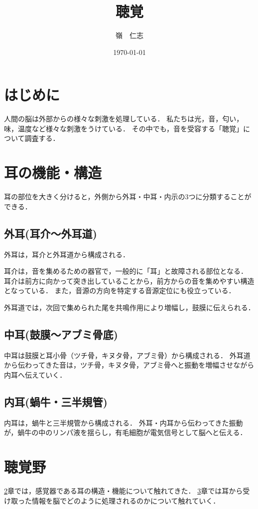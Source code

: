 \documentclass[12pt]{jarticle}
\title{聴覚}
\author{嶺　仁志}
\date{\today}
\begin{document}
\maketitle
\section{はじめに}
\label{intro}
人間の脳は外部からの様々な刺激を処理している．
私たちは光，音，匂い，味，温度など様々な刺激をうけている．
その中でも，音を受容する「聴覚」について調査する．\cite{構造}
\section{耳の機能・構造}
\label{ear}
耳の部位を大きく分けると，外側から外耳・中耳・内示の3つに分類することができる．
\subsection{外耳(耳介～外耳道)}
\label{outer}
外耳は，耳介と外耳道から構成される．

耳介は，音を集めるための器官で，一般的に「耳」と故障される部位となる．
耳介は前方に向かって突き出していることから，前方からの音を集めやすい構造となっている．
また，音源の方向を特定する音源定位にも役立っている．

外耳道では，次回で集められた尾を共鳴作用により増幅し，鼓膜に伝えられる．
\subsection{中耳(鼓膜～アブミ骨底)}
\label{midle}
中耳は鼓膜と耳小骨（ツチ骨，キヌタ骨，アブミ骨）から構成される．
外耳道から伝わってきた音は，ツチ骨，キヌタ骨，アブミ骨へと振動を増幅させながら内耳へ伝えていく．
\subsection{内耳(蝸牛・三半規管)}
\label{inner}
内耳は，蝸牛と三半規管から構成される．
外耳・内耳から伝わってきた振動が，蝸牛の中のリンパ液を揺らし，有毛細胞が電気信号として脳へと伝える．
\section{聴覚野}
\label{聴覚野}
\ref{ear}章では，感覚器である耳の構造・機能について触れてきた．
\ref{聴覚野}章では耳から受け取った情報を脳でどのように処理されるのかについて触れていく．\cite{聴覚野}



\end{document}
